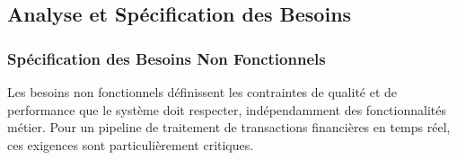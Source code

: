 \clearpage
\newpage

\subsection{Analyse et Spécification des Besoins}
\vspace{0.5cm}

\subsubsection{Spécification des Besoins Non Fonctionnels}
\vspace{0.3cm}

Les besoins non fonctionnels définissent les contraintes de qualité et de performance que le système doit respecter, indépendamment des fonctionnalités métier. Pour un pipeline de traitement de transactions financières en temps réel, ces exigences sont particulièrement critiques.

